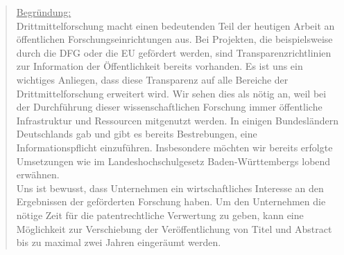 \documentclass[10pt,oneside]{scrartcl}
\begin{document}
\begin{quote}
\underline{Begründung:}\\
Drittmittelforschung macht einen bedeutenden Teil der heutigen Arbeit an öffentlichen Forschungseinrichtungen aus. Bei Projekten, die beispielsweise durch die DFG oder die EU gefördert werden, sind Transparenzrichtlinien zur Information der Öffentlichkeit bereits vorhanden. Es ist uns ein wichtiges Anliegen, dass diese Transparenz auf alle Bereiche der Drittmittelforschung erweitert wird. Wir sehen dies als nötig an, weil bei der Durchführung dieser wissenschaftlichen Forschung immer öffentliche Infrastruktur und Ressourcen mitgenutzt werden. In einigen Bundesländern Deutschlands gab und gibt es bereits Bestrebungen, eine Informationspflicht einzuführen. Insbesondere möchten wir bereits erfolgte Umsetzungen wie im Landeshochschulgesetz Baden-Württembergs lobend erwähnen.\\
Uns ist bewusst, dass Unternehmen ein wirtschaftliches Interesse an den Ergebnissen der geförderten Forschung haben. Um den Unternehmen die nötige Zeit für die patentrechtliche Verwertung zu geben, kann eine Möglichkeit zur Verschiebung der Veröffentlichung von Titel und Abstract bis zu maximal zwei Jahren eingeräumt werden.

\end{quote}
\end{document}
